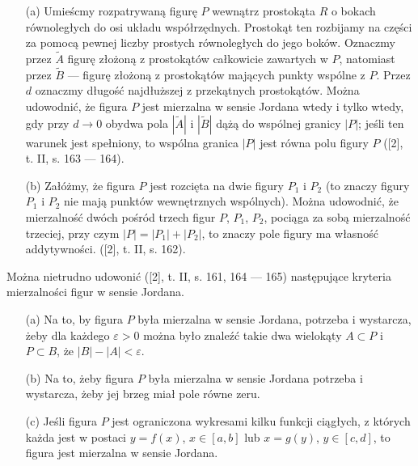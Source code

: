 \documentclass[leqno]{article}
\begin{document}
\begin{justify}
\begin{uwaga}
    \begin{itemize}
        \item [(a)] 
            Umieścmy rozpatrywaną figurę $P$ wewnątrz prostokąta $R$ o bokach równoległych do osi układu współrzędnych.
            Prostokąt ten rozbijamy na części za pomocą pewnej liczby prostych równoległych do jego boków.
            Oznaczmy przez $\tilde{A}$ figurę złożoną z prostokątów całkowicie zawartych w $P$, natomiast
            przez $\tilde{B}$ --- figurę złożoną z prostokątów mających punkty wspólne z $P$. Przez $d$ oznaczmy długość najdłuższej z przekątnych
            prostokątów. Można udowodnić, że figura $P$ jest mierzalna w sensie Jordana wtedy i tylko wtedy, gdy
            przy $d \rightarrow 0$ obydwa pola $|\tilde{A}|$ i $|\tilde{B}|$ dążą do wspólnej granicy $|P|$; jeśli 
            ten warunek jest spełniony, to wspólna granica $|P|$ jest równa polu figury $P$ ([2], t. II, s. 163 --- 164).
        \item [(b)]
            Załóżmy, że figura $P$ jest rozcięta na dwie figury $P_1$ i $P_2$ (to znaczy figury $P_1$ i $P_2$ nie mają punktów
            wewnętrznych wspólnych). Można udowodnić, że mierzalność dwóch pośród trzech figur $P$, $P_1$, $P_2$, pociąga za sobą mierzalność trzeciej, 
            przy czym $|P| = |P_1| + |P_2|$, to znaczy pole figury ma własność addytywności. 
            ([2], t. II, s. 162).    
    \end{itemize}
    Można nietrudno udowonić ([2], t. II, s. 161, 164 --- 165) następujące kryteria mierzalności figur w sensie Jordana.
\end{uwaga}

\begin{theorem}
{
    \begin{itemize}
        \item [(a)] 
            Na to, by figura $P$ była mierzalna w sensie Jordana, potrzeba i wystarcza, żeby
            dla każdego $\varepsilon > 0$ można było znaleźć takie dwa wielokąty $A \subset P$ i $P \subset B$, że $|B| - |A| < \varepsilon$.
        \item [(b)]
            Na to, żeby figura $P$ była mierzalna w sensie Jordana potrzeba i wystarcza, żeby jej brzeg miał pole równe zeru.
        \item [(c)]
            Jeśli figura $P$ jest ograniczona wykresami kilku funkcji ciągłych, z których każda jest w postaci $y = f(x)$, $x \in [a,b]$ lub $x = g(y)$, $y \in [c,d]$, to
            figura jest mierzalna w sensie Jordana.
    \end{itemize}
}
\end{theorem}


\end{justify}
\end{document}
